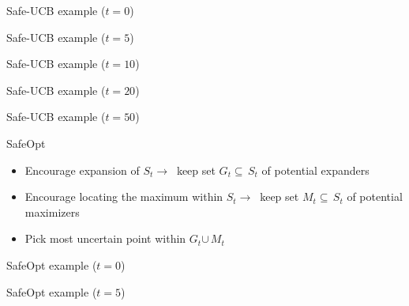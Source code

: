 \documentclass[xetex,10pt,mathserif,handout]{beamer}
\newlength\figureheight
\newlength\figurewidth
\newcommand{\localucb}{{\sc\textsf{Safe-UCB}}\xspace}
\newcommand{\cst}{{\color{cyan!70!black}$S_t$}\xspace}
\newcommand{\cgt}{{\color{lime!70!black}$G_t$}\xspace}
\newcommand{\cmt}{{\color{orange!70!black}$M_t$}\xspace}
\begin{document}
\begin{frame}{\localucb example ($t = 0$)}
\centering
\setlength\figurewidth{5in}
\setlength\figureheight{3.5in}

\end{frame}

\begin{frame}{\localucb example ($t = 5$)}
\centering
\setlength\figurewidth{5in}
\setlength\figureheight{3.5in}

\end{frame}

\begin{frame}{\localucb example ($t = 10$)}
\centering
\setlength\figurewidth{5in}
\setlength\figureheight{3.5in}

\end{frame}

\begin{frame}{\localucb example ($t = 20$)}
\centering
\setlength\figurewidth{5in}
\setlength\figureheight{3.5in}

\end{frame}

\begin{frame}{\localucb example ($t = 50$)}
\centering
\setlength\figurewidth{5in}
\setlength\figureheight{3.5in}

\end{frame}

\begin{frame}{SafeOpt}
\begin{itemize}
  \item<1-> Encourage expansion of \cst $\rightarrow\ $ keep set \cgt$\subseteq\,$\cst of potential expanders
  \vspace{2em}
  \item<2-> Encourage locating the maximum within \cst $\rightarrow\ $ keep set \cmt$\subseteq\,$\cst of potential maximizers
  \vspace{2em}
  \item<3-> Pick most uncertain point within \cgt$\cup\,$\cmt
\end{itemize}
\end{frame}

\begin{frame}{SafeOpt example ($t = 0$)}
  \centering
  \setlength\figurewidth{5in}
  \setlength\figureheight{3.5in}
  
\end{frame}

\begin{frame}{SafeOpt example ($t = 5$)}
  \centering
  \setlength\figurewidth{5in}
  \setlength\figureheight{3.5in}
  
\end{frame}
\end{document}
